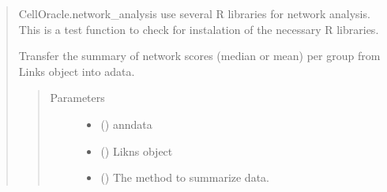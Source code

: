 \documentclass[letterpaper,10pt,english]{sphinxmanual}
\begin{document}
\begin{quote}

\begin{fulllineitems}
\label{\detokenize{modules/celloracle.network_analysis:celloracle.network_analysis.test_R_libraries_installation}}
CellOracle.network\_analysis use several R libraries for network analysis.
This is a test function to check for instalation of the necessary R libraries.

\end{fulllineitems}


\begin{fulllineitems}
\label{\detokenize{modules/celloracle.network_analysis:celloracle.network_analysis.transfer_scores_from_links_to_adata}}
Transfer the summary of network scores (median or mean) per group from Links object into adata.
\begin{quote}\begin{description}
\item[{Parameters}] \leavevmode\begin{itemize}
\item {} 
 () \textendash{} anndata

\item {} 
 ({\hyperref[\detokenize{modules/celloracle:celloracle.Links}]{}}) \textendash{} Likns object

\item {} 
 () \textendash{} The method to summarize data.

\end{itemize}

\end{description}\end{quote}

\end{fulllineitems}

\end{quote}
\end{document}
